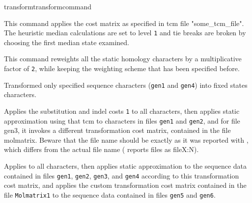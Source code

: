\begin{command}{transform}{transformcommand}
\begin{poyexamples}
		{This command applies the cost matrix as specified in tcm file 
		"some\_tcm\_file".  The heuristic median calculations are set to 
		level \texttt{1} and tie breaks are broken
		 by choosing the first median state examined.}
			 
            	{This command reweights all the static homology characters
            	by a multiplicative factor of \texttt{2}, while keeping the weighting
            	scheme that has been specified before.}
		
		

           	{Transformed only specified sequence characters (\texttt{gen1} and
           	\texttt{gen4}) into fixed states characters.}
	
            	{Applies the substitution and indel costs \texttt{1} to all characters, then applies static approximation
            	using that tcm to characters in files \texttt{gen1} and \texttt{gen2}, and for file
            	gen3, it invokes a different transformation cost matrix, contained
            	in the file molmatrix. Beware that the file name should be exactly
            	as it was reported with , which differs from the actual
            	file name ( reports files as fileX:N).}

            	{Applies  to all characters, then applies
            	static approximation to the sequence data contained in files \texttt{gen1}, \texttt{gen2},
            	\texttt{gen3}, and \texttt{gen4} according to this transformation cost
            	matrix, and applies the custom transformation cost matrix contained in the file
            	\texttt{Molmatrix1} to the sequence data contained in files \texttt{gen5} and
            	\texttt{gen6}.}
         

\end{poyexamples}
\end{command}
